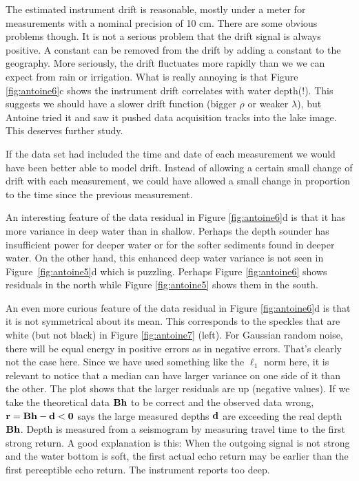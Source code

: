 \par
The estimated instrument drift is reasonable, mostly under a meter
for measurements with a nominal precision of 10 cm.
There are some obvious problems though.
It is not a serious problem that the drift signal is always positive.
A constant can be removed from the drift by adding a constant to the geography.
More seriously, the drift fluctuates
more rapidly than we we can expect from rain or irrigation.
What is really annoying is that
Figure \ref{fig:antoine6}c shows
the instrument drift correlates with water depth(!).
This suggests we should have a slower drift function
(bigger $\rho$ or weaker $\lambda$), but Antoine tried it and saw
it pushed data acquisition tracks into the lake image.
This deserves further study.

\par
If the data set had included the time and date of each measurement
we would have been better able to model drift.
Instead of allowing a certain small change of drift with each measurement,
we could have allowed a small change
in proportion to the time since the previous measurement.

\par
An interesting feature of the data residual in Figure \ref{fig:antoine6}d is
that it has more variance in deep water than in shallow.
Perhaps the depth sounder has insufficient power for deeper water
or for the softer sediments found in deeper water.
On the other hand, this enhanced deep water variance
is not seen in Figure~\ref{fig:antoine5}d which is puzzling.
Perhaps 
Figure \ref{fig:antoine6} shows residuals in the north while
Figure \ref{fig:antoine5} shows them in the south.

\par
An even more curious feature of the data residual
in Figure \ref{fig:antoine6}d is that it is not symmetrical
about its mean.
This corresponds to the speckles that are white
(but not black) in Figure \ref{fig:antoine7} (left).
For Gaussian random noise, there will be equal energy
in positive errors as in negative errors.
That's clearly not the case here.
Since we have used something like the $\ell_1$ norm here,
it is relevant to notice that a median can have larger variance
on one side of it than the other.
The plot shows that the larger residuals are up (negative values).
If we take the theoretical data
$\bold B\bold h$ to be correct and the observed data wrong,
$\bold r=\bold B\bold h-\bold d <\bold 0$
says the large measured depths $\bold d$ are exceeding the real depth
$\bold B\bold h$.
Depth is measured from a seismogram by measuring travel time
to the first strong return.
A good explanation is this:
When the outgoing signal is not strong and the water bottom is soft,
the first actual echo return
may be earlier than the first perceptible echo return.
The instrument reports too deep.









